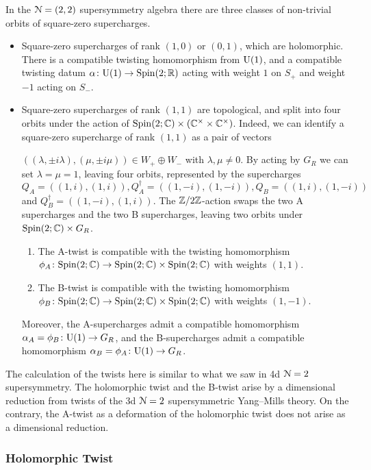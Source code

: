 \documentclass[10pt, oneside]{article}
\begin{document}
In the $\mathcal{N}=(2,2)$ supersymmetry algebra there are three classes of non-trivial orbits of square-zero supercharges.  
\begin{itemize}
 \item Square-zero supercharges of rank $(1,0)$ or $(0,1)$, which are holomorphic.  
There is a compatible twisting homomorphism from $\mathrm{U}(1)$, and a compatible twisting datum $\alpha \colon \mathrm{U}(1) \to \mathrm{Spin}(2;\mathbb R)$ acting with weight $1$ on $S_+$ and weight $-1$ acting on $S_-$.  
 \item Square-zero supercharges of rank $(1,1)$ are topological, and split into four orbits under the action of $\mathrm{Spin}(2;\mathbb C) \times (\mathbb C^\times \times \mathbb C^\times)$.  Indeed, we can identify a square-zero supercharge of rank $(1,1)$ as a pair of vectors~
 
\noindent$((\lambda, \pm i \lambda), (\mu, \pm i \mu)) \in W_+ \oplus W_-$ with $\lambda, \mu \ne 0$.  By acting by $G_R$ we can set $\lambda = \mu = 1$, leaving four orbits, represented by the supercharges $Q_A = ((1,i),(1,i)), Q_A^\dagger = ((1,-i),(1,-i)), Q_B = ((1,i),(1,-i))$ and $Q_B^\dagger = ((1,-i),(1,i))$.  The $\mathbb Z/2\mathbb Z$-action swaps the two A supercharges and the two B supercharges, leaving two orbits under $\mathrm{Spin}(2;\mathbb C) \times G_R$.  
\begin{enumerate}
\item The A-twist is compatible with the twisting homomorphism $\phi_{A} \colon \mathrm{Spin}(2;\mathbb C) \to \mathrm{Spin}(2;\mathbb C) \times \mathrm{Spin}(2;\mathbb C)$ with weights $(1,1)$.
\item The B-twist is compatible with the twisting homomorphism $\phi_{B} \colon \mathrm{Spin}(2;\mathbb C) \to \mathrm{Spin}(2;\mathbb C) \times \mathrm{Spin}(2;\mathbb C)$ with weights $(1,-1)$.  
\end{enumerate}
Moreover, the A-supercharges admit a compatible homomorphism $\alpha_A = \phi_B\colon \mathrm{U}(1)\rightarrow G_R$, and the B-supercharges admit a compatible homomorphism $\alpha_B = \phi_A\colon \mathrm{U}(1)\rightarrow G_R$.
\end{itemize}

The calculation of the twists here is similar to what we saw in 4d $\mathcal{N}=2$ supersymmetry.  
The holomorphic twist and the B-twist arise by a dimensional reduction from twists of the 3d $\mathcal N=2$ supersymmetric Yang--Mills theory.
On the contrary, the A-twist as a deformation of the holomorphic twist does not arise as a dimensional reduction. 

\subsubsection{Holomorphic Twist} \label{sect:2d22minimaltwist}
\end{document}
